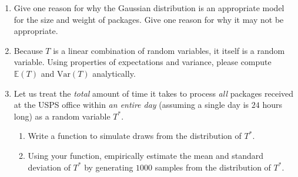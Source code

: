 \documentclass{harvardml}
\theoremstyle{definition}
\theoremstyle{plain}
\begin{document}
\begin{problem}
\begin{enumerate}
    \item Give one reason for why the Gaussian distribution is an appropriate model for the size and weight of packages. Give one reason for why it may not be appropriate.
    \item Because $T$ is a linear combination of random variables, it itself is a random variable. Using properties of expectations and variance, please compute $\mathbb{E}(T)$ and $\mathrm{Var}(T)$ analytically.
    \item Let us treat the \textit{total} amount of time it takes to process \textit{all} packages received at the USPS office within \textit{an entire day} (assuming a single day is $24$ hours long) as a random variable $T^{*}$. 
    \begin{enumerate}
        \item Write a function to simulate draws from the distribution of $T^{*}$. 
        \item Using your function, empirically estimate the mean and standard deviation of $T^{*}$ by generating $1000$ samples from the distribution of $T^{*}$.
    \end{enumerate}
\end{enumerate}
\end{problem}

\newpage
\end{document}
